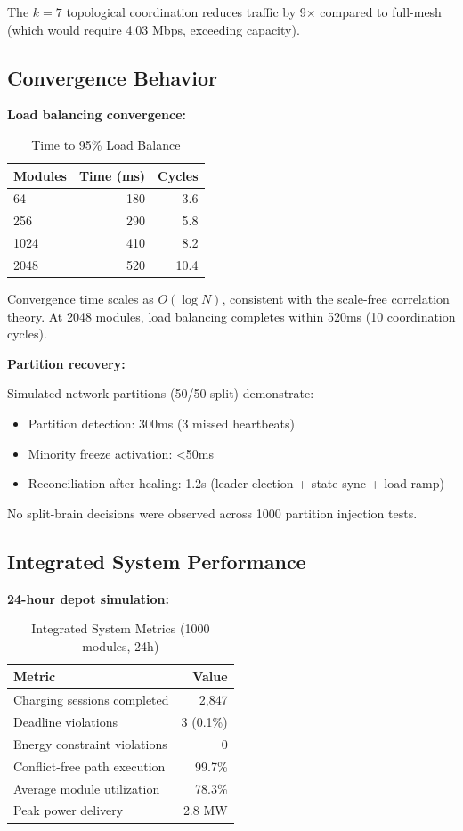 The $k=7$ topological coordination reduces traffic by 9$\times$ compared to full-mesh (which would require 4.03 Mbps, exceeding capacity).

\subsection{Convergence Behavior}

\textbf{Load balancing convergence:}

\begin{table}[htbp]
\centering
\caption{Time to 95\% Load Balance}
\label{tab:convergence}
\begin{tabular}{@{}lrr@{}}
\toprule
Modules & Time (ms) & Cycles \\
\midrule
64 & 180 & 3.6 \\
256 & 290 & 5.8 \\
1024 & 410 & 8.2 \\
2048 & 520 & 10.4 \\
\bottomrule
\end{tabular}
\end{table}

Convergence time scales as $O(\log N)$, consistent with the scale-free correlation theory. At 2048 modules, load balancing completes within 520ms (10 coordination cycles).

\textbf{Partition recovery:}

Simulated network partitions (50/50 split) demonstrate:
\begin{itemize}
    \item Partition detection: 300ms (3 missed heartbeats)
    \item Minority freeze activation: <50ms
    \item Reconciliation after healing: 1.2s (leader election + state sync + load ramp)
\end{itemize}

No split-brain decisions were observed across 1000 partition injection tests.

\subsection{Integrated System Performance}

\textbf{24-hour depot simulation:}

\begin{table}[htbp]
\centering
\caption{Integrated System Metrics (1000 modules, 24h)}
\label{tab:integrated}
\begin{tabular}{@{}lr@{}}
\toprule
Metric & Value \\
\midrule
Charging sessions completed & 2,847 \\
Deadline violations & 3 (0.1\%) \\
Energy constraint violations & 0 \\
Conflict-free path execution & 99.7\% \\
Average module utilization & 78.3\% \\
Peak power delivery & 2.8 MW \\
\bottomrule
\end{tabular}
\end{table}

